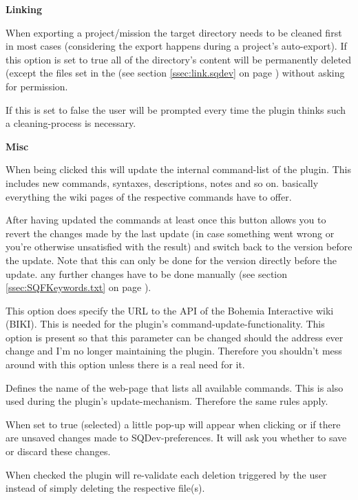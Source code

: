 \documentclass[twoside=false]{scrbook}
\newcommand{\SQDev}{SQDev\xspace}
\newenvironment{options*}{%
	\vspace{3mm}%
	\hrule{}

	\newcommand{\option}[1]{%
		\item \textbf{##1} - \hspace{-1.6mm}%
	}%
	\begin{itemize}%
}{%
	\end{itemize}\hrule%
	\vspace{3mm}%
}
\newenvironment{options}[1][Options]{%
	\needspace{2\baselineskip}
	\textbf{#1}%
	\begin{options*}%
}{%
	\end{options*}%
}
\begin{document}
	\vspace{1.5cm}
	
	\begin{options}[Linking]
		 When exporting a project/mission the target directory needs to be cleaned first in most cases (considering the export happens during a project's auto-export). If this option is set to true all of the directory's content will be permanently deleted (except the files set in the  (see section \ref{ssec:link.sqdev} on page \pageref{ssec:link.sqdev}) without asking for permission.
		
		If this is set to false the user will be prompted every time the plugin thinks such a cleaning-process is necessary.
	\end{options}
	
	\vspace{1.5cm}
	
	\begin{options}[Misc]
		 When being clicked this will update the internal command-list of the plugin. This includes new commands, syntaxes, descriptions, notes and so on. basically everything the wiki pages of the respective commands have to offer.
		
		 After having updated the commands at least once this button allows you to revert the changes made by the last update (in case something went wrong or you're otherwise unsatisfied with the result) and switch back to the version before the update. Note that this can only be done for the version directly before the update. any further changes have to be done manually (see section \ref{ssec:SQFKeywords.txt} on page \pageref{ssec:SQFKeywords.txt}).
		
		 This option does specify the URL to the API of the Bohemia Interactive wiki (BIKI). This is needed for the plugin's command-update-functionality. This option is present so that this parameter can be changed should the address ever change and I'm no longer maintaining the plugin. Therefore you shouldn't mess around with this option unless there is a real need for it.
		
		 Defines the name of the web-page that lists all available commands. This is also used during the plugin's update-mechanism. Therefore the same rules apply.
		
		 When set to true (selected) a little pop-up will appear when clicking  or  if there are unsaved changes made to \SQDev-preferences. It will ask you whether to save or discard these changes.
		
		 When checked the plugin will re-validate each deletion triggered by the user instead of simply deleting the respective file(s).
	\end{options}
	
\end{document}
